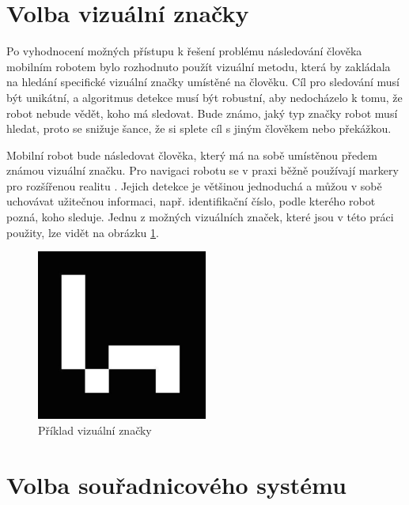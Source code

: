 \documentclass[twoside]{ctuthesis}
\theoremstyle{plain}
\theoremstyle{definition}
\theoremstyle{note}
\begin{document}
\section{Volba vizuální značky}




Po vyhodnocení možných přístupu k řešení problému následování člověka mobilním robotem bylo rozhodnuto použít vizuální metodu, která by zakládala na hledání specifické vizuální značky umístěné na člověku. Cíl pro sledování musí být unikátní, a algoritmus detekce musí být robustní, aby nedocházelo k tomu, že robot nebude vědět, koho má sledovat. Bude známo, jaký typ značky robot musí hledat, proto se snižuje šance, že si splete cíl s jiným člověkem nebo překážkou. 

Mobilní robot bude následovat člověka, který má na sobě umístěnou předem známou vizuální značku. Pro navigaci robotu se v praxi běžně používají markery pro rozšířenou realitu \cite{cite:1}\cite{cite:2}\cite{cite:3}. Jejich detekce je většinou jednoduchá a můžou v sobě uchovávat užitečnou informaci, např. identifikační číslo, podle kterého robot pozná, koho sleduje. Jednu z možných vizuálních značek, které jsou v této práci použity, lze vidět na obrázku \ref{am}.

\begin{figure}[]
	\caption{Příklad vizuální značky}

	\label{am}
	\includegraphics[width=0.5\textwidth]{images/2/ArucoMarker.jpg}
\end{figure}

\section{Volba souřadnicového systému}
\label{ss_section}
\end{document}
